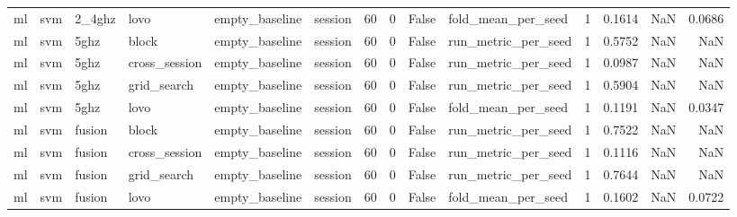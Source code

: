 \begin{tabular}{llllllrrrlrrrr}
ml & svm & 2_4ghz & lovo & empty_baseline & session & 60 & 0 & False & fold_mean_per_seed & 1 & 0.1614 & NaN & 0.0686 \\
ml & svm & 5ghz & block & empty_baseline & session & 60 & 0 & False & run_metric_per_seed & 1 & 0.5752 & NaN & NaN \\
ml & svm & 5ghz & cross_session & empty_baseline & session & 60 & 0 & False & run_metric_per_seed & 1 & 0.0987 & NaN & NaN \\
ml & svm & 5ghz & grid_search & empty_baseline & session & 60 & 0 & False & run_metric_per_seed & 1 & 0.5904 & NaN & NaN \\
ml & svm & 5ghz & lovo & empty_baseline & session & 60 & 0 & False & fold_mean_per_seed & 1 & 0.1191 & NaN & 0.0347 \\
ml & svm & fusion & block & empty_baseline & session & 60 & 0 & False & run_metric_per_seed & 1 & 0.7522 & NaN & NaN \\
ml & svm & fusion & cross_session & empty_baseline & session & 60 & 0 & False & run_metric_per_seed & 1 & 0.1116 & NaN & NaN \\
ml & svm & fusion & grid_search & empty_baseline & session & 60 & 0 & False & run_metric_per_seed & 1 & 0.7644 & NaN & NaN \\
ml & svm & fusion & lovo & empty_baseline & session & 60 & 0 & False & fold_mean_per_seed & 1 & 0.1602 & NaN & 0.0722 \\
\bottomrule
\end{tabular}
